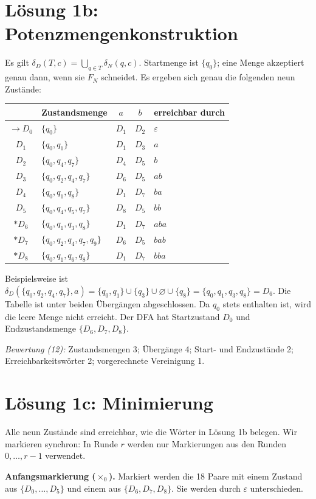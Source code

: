 \documentclass[11pt,a4paper]{article}
\begin{document}
\section*{Lösung 1b: Potenzmengenkonstruktion}
Es gilt $\delta_D(T,c)=\bigcup_{q\in T}\delta_N(q,c)$.
Startmenge ist $\{q_0\}$; eine Menge akzeptiert genau dann, wenn sie
$F_N$ schneidet. Es ergeben sich genau die folgenden neun Zustände:
\begin{center}\small
\begin{tabular}{c|l|cc|l}
 & Zustandsmenge & $a$ & $b$ & erreichbar durch\\\hline
$\to D_0$ & $\{q_{0}\}$ & $D_1$ & $D_2$ & $\varepsilon$\\
$D_1$ & $\{q_{0},q_{1}\}$ & $D_1$ & $D_3$ & $a$\\
$D_2$ & $\{q_{0},q_{4},q_{7}\}$ & $D_4$ & $D_5$ & $b$\\
$D_3$ & $\{q_{0},q_{2},q_{4},q_{7}\}$ & $D_6$ & $D_5$ & $ab$\\
$D_4$ & $\{q_{0},q_{1},q_{8}\}$ & $D_1$ & $D_7$ & $ba$\\
$D_5$ & $\{q_{0},q_{4},q_{5},q_{7}\}$ & $D_8$ & $D_5$ & $bb$\\
$*D_6$ & $\{q_{0},q_{1},q_{3},q_{8}\}$ & $D_1$ & $D_7$ & $aba$\\
$*D_7$ & $\{q_{0},q_{2},q_{4},q_{7},q_{9}\}$ & $D_6$ & $D_5$ & $bab$\\
$*D_8$ & $\{q_{0},q_{1},q_{6},q_{8}\}$ & $D_1$ & $D_7$ & $bba$\\
\end{tabular}
\end{center}
Beispielsweise ist
$\delta_D(\{q_0,q_2,q_4,q_7\},a)
=\{q_0,q_1\}\cup\{q_3\}\cup\varnothing\cup\{q_8\}
=\{q_0,q_1,q_3,q_8\}=D_6$.
Die Tabelle ist unter beiden Übergängen abgeschlossen. Da $q_0$ stets
enthalten ist, wird die leere Menge nicht erreicht.
Der DFA hat Startzustand $D_0$ und Endzustandsmenge $\{D_6,D_7,D_8\}$.

\textit{Bewertung (12):} Zustandsmengen 3; Übergänge 4; Start- und
Endzustände 2; Erreichbarkeitswörter 2; vorgerechnete Vereinigung 1.

\newpage
\section*{Lösung 1c: Minimierung}
Alle neun Zustände sind erreichbar, wie die Wörter in Lösung 1b belegen.
Wir markieren synchron: In Runde $r$ werden nur Markierungen aus den
Runden $0,\ldots,r-1$ verwendet.

\textbf{Anfangsmarkierung ($\times_0$).} Markiert werden die 18 Paare mit
einem Zustand aus $\{D_0,\ldots,D_5\}$ und einem aus $\{D_6,D_7,D_8\}$.
Sie werden durch $\varepsilon$ unterschieden.
\end{document}
